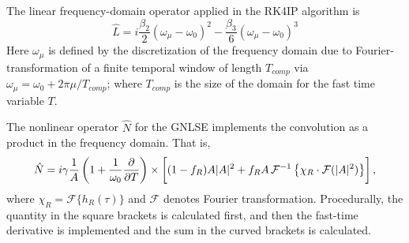 The linear frequency-domain operator applied in the RK4IP algorithm is
\begin{equation}
\hat{L}=i\frac{\beta_2}{2}(\omega_\mu-\omega_0)^2-\frac{\beta_3}{6}(\omega_\mu-\omega_0)^3
\end{equation}
Here $\omega_\mu$ is defined by the discretization of the frequency domain due to Fourier-transformation of a finite temporal window of length $T_{comp}$ via $\omega_\mu=\omega_0+2\pi\mu/T_{comp}$; where $T_{comp}$ is the size of the domain for the fast time variable $T$.

The nonlinear operator $\hat{N}$ for the GNLSE implements the convolution as a product in the frequency domain. That is, 
\begin{equation}
\hat{N}=i\gamma\frac{1}{A}\left(1+\frac{1}{\omega_0}\frac{\partial}{\partial T}\right)\times\left[\vphantom{\frac{\partial}{\partial T}}(1-f_R)A|A|^2+f_R A\, \mathcal{F}^{-1}\left\{\chi_R\cdot\mathcal{F}(|A|^2)\right\}\right],
\end{equation}
where $\chi_R=\mathcal{F}\{h_R(\tau)\}$ and $\mathcal{F}$ denotes Fourier transformation. Procedurally, the quantity in the square brackets is calculated first, and then the fast-time derivative is implemented and the sum in the curved brackets is calculated.






	



